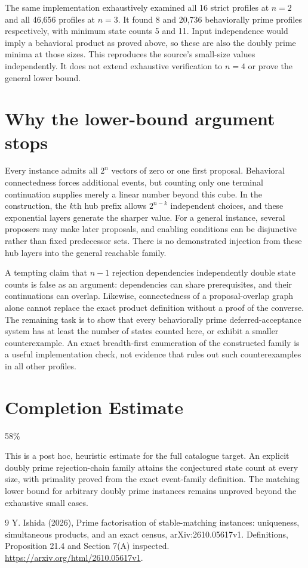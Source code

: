 \documentclass[11pt]{article}
\begin{document}
The same implementation exhaustively examined all 16 strict profiles at $n=2$ and all 46,656 profiles at $n=3$. It found 8 and 20,736 behaviorally prime profiles respectively, with minimum state counts 5 and 11. Input independence would imply a behavioral product as proved above, so these are also the doubly prime minima at those sizes. This reproduces the source's small-size values independently. It does not extend exhaustive verification to $n=4$ or prove the general lower bound.

\section*{Why the lower-bound argument stops}
Every instance admits all $2^n$ vectors of zero or one first proposal. Behavioral connectedness forces additional events, but counting only one terminal continuation supplies merely a linear number beyond this cube. In the construction, the $k$th hub prefix allows $2^{n-k}$ independent choices, and these exponential layers generate the sharper value. For a general instance, several proposers may make later proposals, and enabling conditions can be disjunctive rather than fixed predecessor sets. There is no demonstrated injection from these hub layers into the general reachable family.

A tempting claim that $n-1$ rejection dependencies independently double state counts is false as an argument: dependencies can share prerequisites, and their continuations can overlap. Likewise, connectedness of a proposal-overlap graph alone cannot replace the exact product definition without a proof of the converse. The remaining task is to show that every behaviorally prime deferred-acceptance system has at least the number of states counted here, or exhibit a smaller counterexample. An exact breadth-first enumeration of the constructed family is a useful implementation check, not evidence that rules out such counterexamples in all other profiles.

\section{Completion Estimate}
58\%

This is a post hoc, heuristic estimate for the full catalogue target.
An explicit doubly prime rejection-chain family attains the conjectured state count at every size, with primality proved from the exact event-family definition. The matching lower bound for arbitrary doubly prime instances remains unproved beyond the exhaustive small cases.

\begin{thebibliography}{9}
 Y. Ishida (2026), Prime factorisation of stable-matching instances: uniqueness, simultaneous products, and an exact census, arXiv:2610.05617v1. Definitions, Proposition 21.4 and Section 7(A) inspected. \url{https://arxiv.org/html/2610.05617v1}.
\end{thebibliography}
\end{document}
